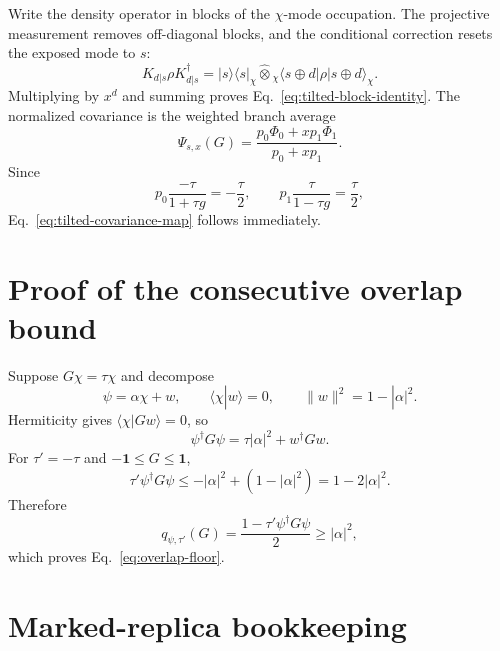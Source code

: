 \documentclass[
  aps,prx,twocolumn,superscriptaddress,longbibliography,
  nofootinbib,floatfix
]{revtex4-2}
\newcommand{\Id}{\mathbf{1}}
\newcommand{\ket}[1]{\lvert #1\rangle}
\newcommand{\bra}[1]{\langle #1\rvert}
\newcommand{\proj}[1]{\lvert #1\rangle\!\langle #1\rvert}
\theoremstyle{plain}
\theoremstyle{definition}
\begin{document}
Write the density operator in blocks of the \(\chi\)-mode occupation.  The
projective measurement removes off-diagonal blocks, and the conditional
correction resets the exposed mode to \(s\):
\begin{equation}
 K_{d|s}\rho K_{d|s}^\dagger
 =\proj{s}_\chi\widehat\otimes
 {}_\chi\!\bra{s\oplus d}\rho
 \ket{s\oplus d}_\chi.
 \label{eq:app-block-branch}
\end{equation}
Multiplying by \(x^d\) and summing proves
Eq.~\eqref{eq:tilted-block-identity}.  The normalized covariance is the
weighted branch average
\begin{equation}
 \Psi_{s,x}(G)
 =\frac{p_0\Phi_0+xp_1\Phi_1}{p_0+xp_1}.
 \label{eq:app-weighted-covariance}
\end{equation}
Since
\begin{equation}
 p_0\frac{-\tau}{1+\tau g}=-\frac{\tau}{2},
 \qquad
 p_1\frac{\tau}{1-\tau g}=\frac{\tau}{2},
 \label{eq:app-weight-cancellation}
\end{equation}
Eq.~\eqref{eq:tilted-covariance-map} follows immediately.

\section{Proof of the consecutive overlap bound}
\label{app:geometric-bound}

Suppose \(G\chi=\tau\chi\) and decompose
\begin{equation}
 \psi=\alpha\chi+w,
 \qquad \langle\chi|w\rangle=0,
 \qquad \|w\|^2=1-|\alpha|^2.
 \label{eq:app-psi-decomposition}
\end{equation}
Hermiticity gives \(\langle\chi|Gw\rangle=0\), so
\begin{equation}
 \psi^\dagger G\psi
 =\tau|\alpha|^2+w^\dagger Gw.
 \label{eq:app-gpsi}
\end{equation}
For \(\tau'=-\tau\) and \(-\Id\leq G\leq\Id\),
\begin{equation}
 \tau'\psi^\dagger G\psi
 \leq-|\alpha|^2+(1-|\alpha|^2)
 =1-2|\alpha|^2.
 \label{eq:app-alignment-bound}
\end{equation}
Therefore
\begin{equation}
 q_{\psi,\tau'}(G)
 =\frac{1-\tau'\psi^\dagger G\psi}{2}
 \geq|\alpha|^2,
 \end{equation}
which proves Eq.~\eqref{eq:overlap-floor}.

\section{Marked-replica bookkeeping}
\label{app:marked-replicas}
\end{document}
